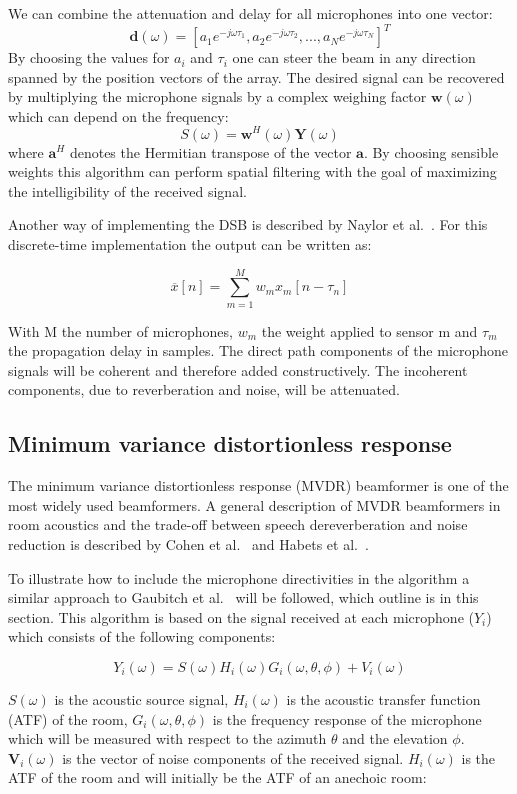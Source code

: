 We can combine the attenuation and delay for all microphones into one vector:
\[
\textbf{d}(\omega) = [a_{1}e^{-j\omega\tau_{1}},a_{2}e^{-j\omega\tau_{2}},...,a_{N}e^{-j\omega\tau_{N}}]^{T}
\]
By choosing the values for $a_{i}$ and $\tau_{i}$ one can steer the beam in any direction spanned by the position vectors of the array. The desired signal can be recovered by multiplying the microphone signals by a complex weighing factor $\textbf{w}(\omega)$ which can depend on the frequency:
\[
S(\omega) = \textbf{w}^{H}(\omega)\textbf{Y}(\omega)
\]
where $\textbf{a}^{H}$ denotes the Hermitian transpose of the vector $\textbf{a}$. By choosing sensible weights this algorithm can perform spatial filtering with the goal of maximizing the intelligibility of the received signal.

Another way of implementing the DSB is described by Naylor et al.\ \cite{naylor2010speech}. For this discrete-time implementation the output can be written as:

\[
\overline{x}[n] = \sum_{m=1}^{M} w_{m}x_{m}[n-\tau_{n}]
\]

With M the number of microphones, $w_{m}$ the weight applied to sensor m and $\tau_{m}$ the propagation delay in samples. The direct path components of the microphone signals will be coherent and therefore added constructively. The incoherent components, due to reverberation and noise, will be attenuated.

\subsection{Minimum variance distortionless response}
The minimum variance distortionless response (MVDR) beamformer is one of the most widely used beamformers. A general description of MVDR beamformers in room acoustics and the trade-off between speech dereverberation and noise reduction is described by Cohen et al.\ \cite{springer2010} and Habets et al.\ \cite{habets2010}. 

To illustrate how to include the microphone directivities in the algorithm a similar approach to Gaubitch et al.\ \cite{Gaubitch2014} will be followed, which outline is in this section. This algorithm is based on the signal received at each microphone ($Y_{i}$) which consists of the following components:

\[
Y_{i}(\omega) = S(\omega)H_{i}(\omega)G_{i}(\omega, \theta, \phi) + V_{i}(\omega)
\]

$S(\omega)$ is the acoustic source signal, $H_{i}(\omega)$ is the acoustic transfer function (ATF) of the room, $G_{i}(\omega, \theta, \phi)$ is the frequency response of the microphone which will be measured with respect to the azimuth $\theta$ and the elevation $\phi$. $\textbf{V}_{i}(\omega)$ is the vector of noise components of the received signal. $H_{i}(\omega)$ is the ATF of the room and will initially be the ATF of an anechoic room:

